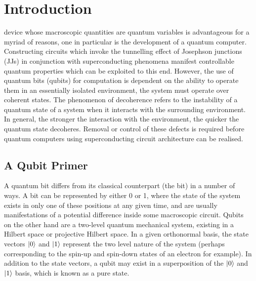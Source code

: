 \chapter{Introduction}\label{ch:introduction}

 device whose macroscopic quantities are quantum variables is advantageous for a myriad of reasons, one in particular is the development of a quantum computer.
Constructing circuits which invoke the tunnelling effect of Josephson junctions (JJs) in conjunction with superconducting phenomena manifest controllable quantum properties which can be exploited to this end.
However, the use of quantum bits (qubits) for computation is dependent on the ability to operate them in an essentially isolated environment, \ie the system must operate over coherent states.
The phenomenon of decoherence refers to the instability of a quantum state of a system when it interacts with the surrounding environment.
In general, the stronger the interaction with the environment, the quicker the quantum state decoheres.
Removal or control of these defects is required before quantum computers using superconducting circuit architecture can be realised.

\section{A Qubit Primer}
A quantum bit differs from its classical counterpart (the bit) in a number of ways.
A bit can be represented by either 0 or 1, where the state of the system exists in only one of these positions at any given time, and are usually manifestations of a potential difference inside some macroscopic circuit.
Qubits on the other hand are a two-level quantum mechanical system, existing in a Hilbert space or projective Hilbert space.
In a given orthonormal basis, the state vectors $\lvert0\rangle$ and $\lvert1\rangle$ represent the two level nature of the system (perhaps corresponding to the spin-up and spin-down states of an electron for example).
In addition to the state vectors, a qubit may exist in a superposition of the $\lvert0\rangle$ and $\lvert1\rangle$ basis, which is known as a pure state.

